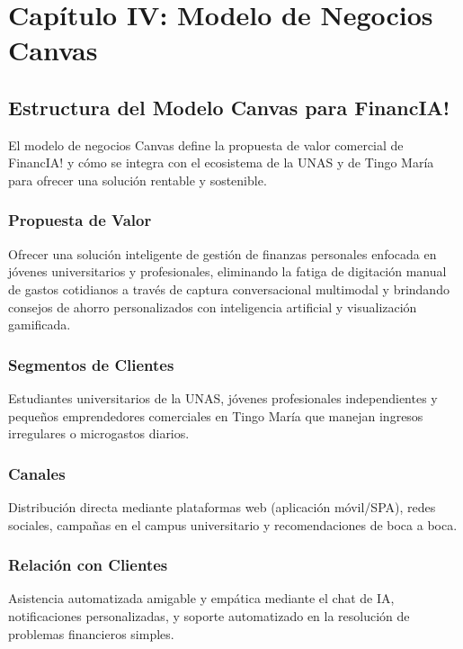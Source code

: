 \documentclass[12pt]{article}
\begin{document}
\newpage

\section{Capítulo IV: Modelo de Negocios Canvas}

\subsection{Estructura del Modelo Canvas para FinancIA!}
El modelo de negocios Canvas define la propuesta de valor comercial de FinancIA! y cómo se integra con el ecosistema de la UNAS y de Tingo María para ofrecer una solución rentable y sostenible.

\subsubsection{Propuesta de Valor}
Ofrecer una solución inteligente de gestión de finanzas personales enfocada en jóvenes universitarios y profesionales, eliminando la fatiga de digitación manual de gastos cotidianos a través de captura conversacional multimodal y brindando consejos de ahorro personalizados con inteligencia artificial y visualización gamificada.

\subsubsection{Segmentos de Clientes}
Estudiantes universitarios de la UNAS, jóvenes profesionales independientes y pequeños emprendedores comerciales en Tingo María que manejan ingresos irregulares o microgastos diarios.

\subsubsection{Canales}
Distribución directa mediante plataformas web (aplicación móvil/SPA), redes sociales, campañas en el campus universitario y recomendaciones de boca a boca.

\subsubsection{Relación con Clientes}
Asistencia automatizada amigable y empática mediante el chat de IA, notificaciones personalizadas, y soporte automatizado en la resolución de problemas financieros simples.
\end{document}
